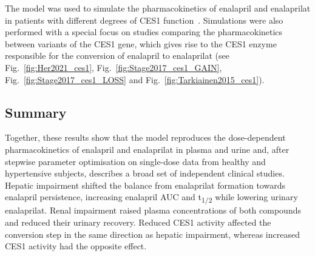 The model was used to simulate the pharmacokinetics of enalapril and enalaprilat in patients with different degrees of CES1 function~\cite{Her2021, Stage2017, Tarkiainen2015}. Simulations were also performed with a special focus on studies comparing the pharmacokinetics between variants of the CES1 gene, which gives rise to the CES1 enzyme responsible for the conversion of enalapril to enalaprilat (see Fig.~\ref{fig:Her2021_ces1}, Fig.~\ref{fig:Stage2017_ces1_GAIN}, Fig.~\ref{fig:Stage2017_ces1_LOSS} and Fig.~\ref{fig:Tarkiainen2015_ces1}).

\subsection{Summary}
Together, these results show that the model reproduces the dose-dependent pharmacokinetics of enalapril and enalaprilat in plasma and urine and, after stepwise parameter optimisation on single-dose data from healthy and hypertensive subjects, describes a broad set of independent clinical studies. Hepatic impairment shifted the balance from enalaprilat formation towards enalapril persistence, increasing enalapril AUC and t\textsubscript{1/2} while lowering urinary enalaprilat. Renal impairment raised plasma concentrations of both compounds and reduced their urinary recovery. Reduced CES1 activity affected the conversion step in the same direction as hepatic impairment, whereas increased CES1 activity had the opposite effect.
